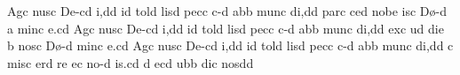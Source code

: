 \Internote
\nosolesmescustos
\initiumgregorianum
\sgn {}Ag\punctum c\egn
\sgn nus\punctum c\egn
\spatium
\sgn D{e}-\pes cd\egn
\sgn {}i,\punctum d\augmentum d\egn
\spatium
\divisiominima
\spatium
{}i{}\punctum d\egn
\spatium
\sgn t{o}l\punctum d\egn
\sgn lis\punctum d\egn
\spatium
\sgn pec\punctum c\egn
\sgn c{\a}-\punctum d\egn
{}a{}\bmolle b\punctum b\egn
\spatium
\sgn m{u}n\punctum c\egn
\sgn di,\punctum d\augmentum d\egn
\spatium
\divisiomaior
\spatium
\sgn p{a}r\punctum c\egn
\sgn ce{}\punctum d\egn
\spatium
\sgn n{o}b\punctum e\egn
\sgn {}is\punctum c\egn
\spatium
\sgn D{\o}-\punctum d\egn
\custos a
\lineaproxima
\sgn min\punctum c\egn
\sgn {}e.\punctum c\augmentum d\egn
\spatium
\divisiofinalis
\spatium
\sgn {}Ag\punctum c\egn
\sgn nus\punctum c\egn
\spatium
\sgn D{e}-\pes cd\egn
\sgn {}i,\punctum d\augmentum d\egn
\spatium
\divisiominima
\spatium
{}i{}\punctum d\egn
\spatium
\sgn t{o}l\punctum d\egn
\sgn lis\punctum d\egn
\spatium
\sgn pec\punctum c\egn
\sgn c{\a}-\punctum d\egn
{}a{}\bmolle b\punctum b\egn
\spatium
\sgn m{u}n\punctum c\egn
\sgn di,\punctum d\augmentum d\egn
\spatium
\divisiomaior
\spatium
\sgn {}ex\punctum c\egn
\sgn {}{\a}u\punctum d\egn
\sgn di{}\punctum e\egn
\spatium
\custos b
\lineaproxima
\sgn nos\punctum c\egn
\spatium
\sgn D{\o}-\punctum d\egn
\sgn min\punctum c\egn
\sgn {}e.\punctum c\augmentum d\egn
\spatium
\divisiofinalis
\spatium
\sgn {}Ag\punctum c\egn
\sgn nus\punctum c\egn
\spatium
\sgn D{e}-\pes cd\egn
\sgn {}i,\punctum d\augmentum d\egn
\spatium
\divisiominima
\spatium
{}i{}\punctum d\egn
\spatium
\sgn t{o}l\punctum d\egn
\sgn lis\punctum d\egn
\spatium
\sgn pec\punctum c\egn
\sgn c{\a}-\punctum d\egn
{}a{}\bmolle b\punctum b\egn
\spatium
\sgn m{u}n\punctum c\egn
\sgn di,\punctum d\augmentum d\egn
\spatium
\divisiomaior
\spatium
\custos c
\lineaproxima
\sgn mis\punctum c\egn
\sgn {}er\punctum d\egn
\sgn {}{\e}r\punctum e\egn
\sgn {}e{}\punctum c\egn
\spatium
\sgn n{o}-\punctum d\egn
{}i{s.}\punctum c\augmentum d\egn
\spatium
\divisiofinalis
\spatium
{}\punctum d\egn
\sgn {}e{}\pes cd\egn
\spatium
{}u\bmolle b\punctum b\egn
\sgn di{}\punctum c\egn
\spatium
\sgn nos\punctum d\augmentum d\egn

